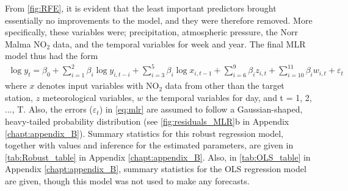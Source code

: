 From \cref{fig:RFE}, it is evident that the least important predictors brought essentially no improvements to the model, and they were therefore removed. More specifically, these variables were; precipitation, atmospheric pressure, the Norr Malma NO$_2$ data, and the temporal variables for week and year. The final MLR model thus had the form
\begin{align}
\log y_t = \beta_0 + \sum_{i=1}^{2} \beta_{i} \log y_{i,t-i} + \sum_{i=3}^{5} \beta_{i} \log x_{i,t-1} + \sum_{i=6}^{9} \beta_{i} z_{i,t}  + \sum_{i=10}^{11} \beta_{i} w_{i,t} +  \varepsilon_t
\label{eq:mlr}
\end{align}
where $x$ denotes input variables with NO$_2$ data from other than the target station, $z$ meteorological variables, $w$ the temporal variables for day, and t = 1, 2, ..., T. Also, the errors ($\varepsilon_t$) in \cref{eq:mlr} are assumed to follow a Gaussian-shaped, heavy-tailed probability distribution (see \cref{fig:residuals_MLR}b in Appendix \ref{chapt:appendix_B}). Summary statistics for this robust regression model, together with values and inference for the estimated parameters, are given in \cref{tab:Robust_table} in Appendix \ref{chapt:appendix_B}. Also, in \cref{tab:OLS_table} in Appendix \ref{chapt:appendix_B}, summary statistics for the OLS regression model are given, though this model was not used to make any forecasts. \\




